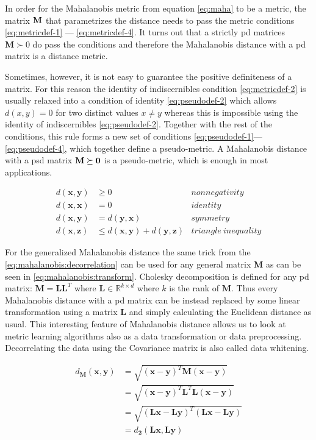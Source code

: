 \documentclass[12pt,a4paper]{report}
\begin{document}
In order for the Mahalanobis metric from equation \eqref{eq:maha} to be a metric, the matrix $\bf{M}$ that parametrizes the distance needs to pass the metric conditions \ref{eq:metricdef-1} --- \ref{eq:metricdef-4}. It turns out that a strictly \ac{pd} matrices $\bm{M} \succ 0$ do pass the conditions and therefore the Mahalanobis distance with a \ac{pd} matrix is a distance metric.

Sometimes, however, it is not easy to guarantee the positive definiteness of a matrix. For this reason the identity of indiscernibles condition \ref{eq:metricdef-2} is usually relaxed into a condition of identity \ref{eq:pseudodef-2} which allows $d(x,y)=0$ for two distinct values $x \neq y$ whereas this is impossible using the identity of indiscernibles \ref{eq:pseudodef-2}. Together with the rest of the conditions, this rule forms a new set of conditions \ref{eq:pseudodef-1}---\ref{eq:pseudodef-4}, which together define a pseudo-metric. A Mahalanobis distance with a \ac{psd} matrix $\bf{M} \succeq 0$ is a pseudo-metric, which is enough in most applications.

\begin{align}
d(\textbf{x},\textbf{y}) &\geq 0 & nonnegativity \label{eq:pseudodef-1} \\
d(\textbf{x},\textbf{x}) &= 0 & identity \label{eq:pseudodef-2} \\
d(\textbf{x},\textbf{y}) &= d(\textbf{y},\textbf{x}) & symmetry \label{eq:pseudodef-3} \\
d(\textbf{x},\textbf{z}) &\leq d(\textbf{x},\textbf{y}) + d(\textbf{y},\textbf{z}) & triangle \ inequality \label{eq:pseudodef-4}
\end{align} 

For the generalized Mahalanobis distance the same trick from the \ref{eq:mahalanobis:decorrelation} can be used for any general matrix $\bm{M}$ as can be seen in \ref{eq:mahalanobis:transform}. Cholesky decomposition is defined for any \ac{pd} matrix: $\bm{M}=\bm{L}\bm{L}^T$ where $\bm{L} \in \mathbb{R}^{k \times d}$ where $k$ is the rank of $\bm{M}$. Thus every Mahalanobis distance with a \ac{pd} matrix can be instead replaced by some linear transformation using a matrix $\bm{L}$ and simply calculating the Euclidean distance as usual. This interesting feature of Mahalanobis distance allows us to look at metric learning algorithms also as a data transformation or data preprocessing. Decorrelating the data using the Covariance matrix is also called data whitening.

\begin{align}
  d_{\bm{M}}(\textbf{x},\textbf{y}) &= \sqrt{(\textbf{x}-\textbf{y})^{T}\bm{M}(\textbf{x}-\textbf{y})} \nonumber\\
         &= \sqrt{(\textbf{x}-\textbf{y})^{T}\bm{L}^{T}\bm{L}(\textbf{x}-\textbf{y})} \nonumber\\
         &= \sqrt{(\bm{L}\textbf{x}-\bm{L}\textbf{y})^{T}(\bm{L}\textbf{x}-\bm{L}\textbf{y})} \nonumber\\
         &= d_{\bm{2}}(\bm{L}\textbf{x}, \bm{L}\textbf{y}) \label{eq:mahalanobis:transform}
\end{align}
\end{document}
